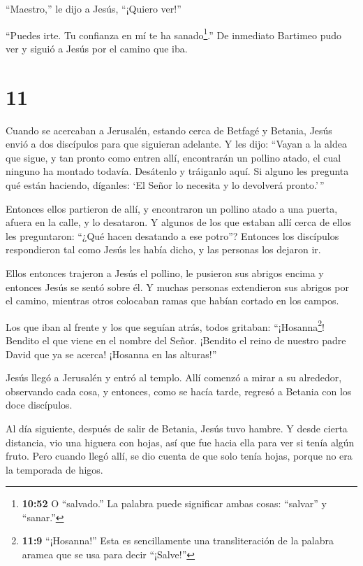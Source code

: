 ``Maestro,'' le dijo a Jesús, ``¡Quiero ver!''

 ``Puedes irte. Tu confianza en mí te ha
sanado\footnote{\textbf{10:52} O ``salvado.'' La palabra puede
  significar ambas cosas: ``salvar'' y ``sanar.''}.'' De inmediato
Bartimeo pudo ver y siguió a Jesús por el camino que iba.

\hypertarget{section-10}{%
\section{11}\label{section-10}}

 Cuando se acercaban a Jerusalén, estando cerca de Betfagé y
Betania, Jesús envió a dos discípulos para que siguieran adelante.
 Y les dijo: ``Vayan a la aldea que sigue, y tan pronto como
entren allí, encontrarán un pollino atado, el cual ninguno ha montado
todavía. Desátenlo y tráiganlo aquí.  Si alguno les pregunta
qué están haciendo, díganles: `El Señor lo necesita y lo devolverá
pronto.'\,''

 Entonces ellos partieron de allí, y encontraron un pollino
atado a una puerta, afuera en la calle, y lo desataron.  Y
algunos de los que estaban allí cerca de ellos les preguntaron: ``¿Qué
hacen desatando a ese potro''?  Entonces los discípulos
respondieron tal como Jesús les había dicho, y las personas los dejaron
ir.

 Ellos entonces trajeron a Jesús el pollino, le pusieron sus
abrigos encima y entonces Jesús se sentó sobre él.  Y muchas
personas extendieron sus abrigos por el camino, mientras otros colocaban
ramas que habían cortado en los campos.

 Los que iban al frente y los que seguían atrás, todos
gritaban: ``¡Hosanna\footnote{\textbf{11:9} ``¡Hosanna!'' Esta es
  sencillamente una transliteración de la palabra aramea que se usa para
  decir ``¡Salve!''}! Bendito el que viene en el nombre del Señor.
 ¡Bendito el reino de nuestro padre David que ya se acerca!
¡Hosanna en las alturas!''

 Jesús llegó a Jerusalén y entró al templo. Allí comenzó a
mirar a su alrededor, observando cada cosa, y entonces, como se hacía
tarde, regresó a Betania con los doce discípulos.

 Al día siguiente, después de salir de Betania, Jesús tuvo
hambre.  Y desde cierta distancia, vio una higuera con
hojas, así que fue hacia ella para ver si tenía algún fruto. Pero cuando
llegó allí, se dio cuenta de que solo tenía hojas, porque no era la
temporada de higos.

